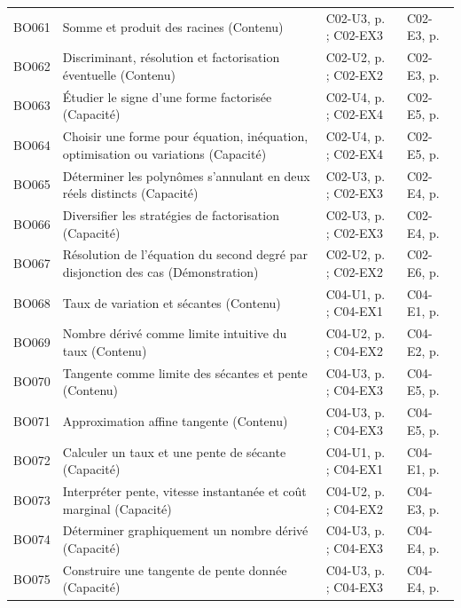 \begin{longtable}{p{.1\linewidth}p{.43\linewidth}p{.19\linewidth}p{.16\linewidth}}
BO061 & Somme et produit des racines (Contenu) & C02-U3, p.\,\pageref{C02-U3} ; C02-EX3 & C02-E3, p.\,\pageref{C02-E3} \\
BO062 & Discriminant, résolution et factorisation éventuelle (Contenu) & C02-U2, p.\,\pageref{C02-U2} ; C02-EX2 & C02-E3, p.\,\pageref{C02-E3} \\
BO063 & Étudier le signe d’une forme factorisée (Capacité) & C02-U4, p.\,\pageref{C02-U4} ; C02-EX4 & C02-E5, p.\,\pageref{C02-E5} \\
BO064 & Choisir une forme pour équation, inéquation, optimisation ou variations (Capacité) & C02-U4, p.\,\pageref{C02-U4} ; C02-EX4 & C02-E5, p.\,\pageref{C02-E5} \\
BO065 & Déterminer les polynômes s’annulant en deux réels distincts (Capacité) & C02-U3, p.\,\pageref{C02-U3} ; C02-EX3 & C02-E4, p.\,\pageref{C02-E4} \\
BO066 & Diversifier les stratégies de factorisation (Capacité) & C02-U3, p.\,\pageref{C02-U3} ; C02-EX3 & C02-E4, p.\,\pageref{C02-E4} \\
BO067 & Résolution de l’équation du second degré par disjonction des cas (Démonstration) & C02-U2, p.\,\pageref{C02-U2} ; C02-EX2 & C02-E6, p.\,\pageref{C02-E6} \\
BO068 & Taux de variation et sécantes (Contenu) & C04-U1, p.\,\pageref{C04-U1} ; C04-EX1 & C04-E1, p.\,\pageref{C04-E1} \\
BO069 & Nombre dérivé comme limite intuitive du taux (Contenu) & C04-U2, p.\,\pageref{C04-U2} ; C04-EX2 & C04-E2, p.\,\pageref{C04-E2} \\
BO070 & Tangente comme limite des sécantes et pente (Contenu) & C04-U3, p.\,\pageref{C04-U3} ; C04-EX3 & C04-E5, p.\,\pageref{C04-E5} \\
BO071 & Approximation affine tangente (Contenu) & C04-U3, p.\,\pageref{C04-U3} ; C04-EX3 & C04-E5, p.\,\pageref{C04-E5} \\
BO072 & Calculer un taux et une pente de sécante (Capacité) & C04-U1, p.\,\pageref{C04-U1} ; C04-EX1 & C04-E1, p.\,\pageref{C04-E1} \\
BO073 & Interpréter pente, vitesse instantanée et coût marginal (Capacité) & C04-U2, p.\,\pageref{C04-U2} ; C04-EX2 & C04-E3, p.\,\pageref{C04-E3} \\
BO074 & Déterminer graphiquement un nombre dérivé (Capacité) & C04-U3, p.\,\pageref{C04-U3} ; C04-EX3 & C04-E4, p.\,\pageref{C04-E4} \\
BO075 & Construire une tangente de pente donnée (Capacité) & C04-U3, p.\,\pageref{C04-U3} ; C04-EX3 & C04-E4, p.\,\pageref{C04-E4} \\

\end{longtable}
